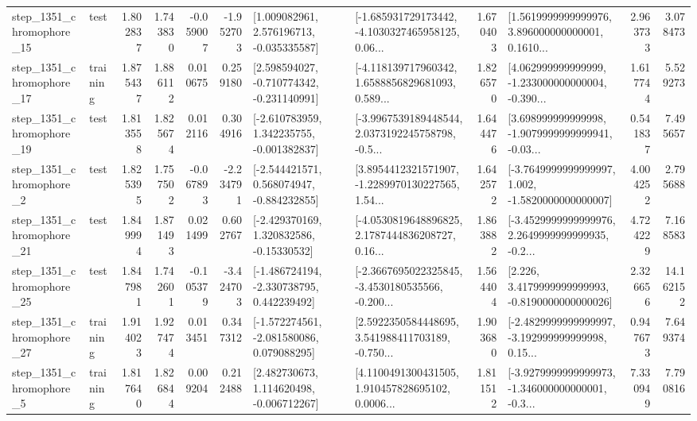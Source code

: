 \begin{tabular}{llrrrrllrlrr}
 step\_1351\_chromophore\_15 &      test &      1.802837 &    1.743830 &     -0.059007 & -1.952703 &    [1.009082961, 2.576196713, -0.035335587] &  [-1.685931729173442, -4.1030327465958125, 0.06... &       1.670403 &  [1.5619999999999976, 3.896000000000001, 0.1610... &            2.963733 &          3.078473 \\
 step\_1351\_chromophore\_17 &  training &      1.875437 &    1.886112 &      0.010675 &  0.259180 &   [2.598594027, -0.710774342, -0.231140991] &  [-4.118139717960342, 1.6588856829681093, 0.589... &       1.826570 &  [4.062999999999999, -1.233000000000004, -0.390... &            1.617744 &          5.529273 \\
 step\_1351\_chromophore\_19 &      test &      1.813558 &    1.825674 &      0.012116 &  0.304916 &   [-2.610783959, 1.342235755, -0.001382837] &  [-3.9967539189448544, 2.0373192245758798, -0.5... &       1.644476 &  [3.698999999999998, -1.9079999999999941, -0.03... &            0.541837 &          7.495657 \\
  step\_1351\_chromophore\_2 &      test &      1.825395 &    1.757502 &     -0.067893 & -2.234791 &   [-2.544421571, 0.568074947, -0.884232855] &  [3.8954412321571907, -1.2289970130227565, 1.54... &       1.642572 &  [-3.7649999999999997, 1.002, -1.5820000000000007] &            4.004252 &          2.795688 \\
 step\_1351\_chromophore\_21 &      test &      1.849994 &    1.871493 &      0.021499 &  0.602767 &    [-2.429370169, 1.320832586, -0.15330532] &  [-4.0530819648896825, 2.1787444836208727, 0.16... &       1.863882 &  [-3.4529999999999976, 2.2649999999999935, -0.2... &            4.724229 &          7.168583 \\
 step\_1351\_chromophore\_25 &      test &      1.847981 &    1.742601 &     -0.105379 & -3.424703 &   [-1.486724194, -2.330738795, 0.442239492] &  [-2.3667695022325845, -3.4530180535566, -0.200... &       1.564404 &   [2.226, 3.4179999999999993, -0.8190000000000026] &            2.326656 &         14.162152 \\
 step\_1351\_chromophore\_27 &  training &      1.914023 &    1.927474 &      0.013451 &  0.347312 &   [-1.572274561, -2.081580086, 0.079088295] &  [2.5922350584448695, 3.541988411703189, -0.750... &       1.903680 &  [-2.4829999999999997, -3.192999999999998, 0.15... &            0.947673 &          7.649374 \\
  step\_1351\_chromophore\_5 &  training &      1.817640 &    1.826844 &      0.009204 &  0.212488 &    [2.482730673, 1.114620498, -0.006712267] &  [4.1100491300431505, 1.910457828695102, 0.0006... &       1.811512 &  [-3.9279999999999973, -1.346000000000001, -0.3... &            7.330949 &          7.790816 \\

\end{tabular}
